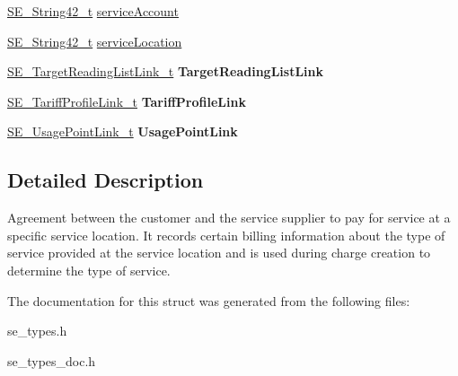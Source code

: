 \begin{DoxyCompactItemize}
\hyperlink{group__String42_gad5a294b994fa3a024ca6d747f784f0d9}{S\+E\+\_\+\+String42\+\_\+t} \hyperlink{group__CustomerAgreement_ga697dece44e28455e87d8bab8035f602f}{service\+Account}
\item 
\hyperlink{group__String42_gad5a294b994fa3a024ca6d747f784f0d9}{S\+E\+\_\+\+String42\+\_\+t} \hyperlink{group__CustomerAgreement_ga8215bbc6ed1bacb861e7b4aacb3cd931}{service\+Location}
\item 
\hyperlink{structSE__TargetReadingListLink__t}{S\+E\+\_\+\+Target\+Reading\+List\+Link\+\_\+t} {\bfseries Target\+Reading\+List\+Link}
\item 
\hyperlink{structSE__TariffProfileLink__t}{S\+E\+\_\+\+Tariff\+Profile\+Link\+\_\+t} {\bfseries Tariff\+Profile\+Link}
\item 
\hyperlink{structSE__UsagePointLink__t}{S\+E\+\_\+\+Usage\+Point\+Link\+\_\+t} {\bfseries Usage\+Point\+Link}
\end{DoxyCompactItemize}


\subsection{Detailed Description}
Agreement between the customer and the service supplier to pay for service at a specific service location. It records certain billing information about the type of service provided at the service location and is used during charge creation to determine the type of service. 

The documentation for this struct was generated from the following files\+:\begin{DoxyCompactItemize}
\item 
se\+\_\+types.\+h\item 
se\+\_\+types\+\_\+doc.\+h\end{DoxyCompactItemize}
